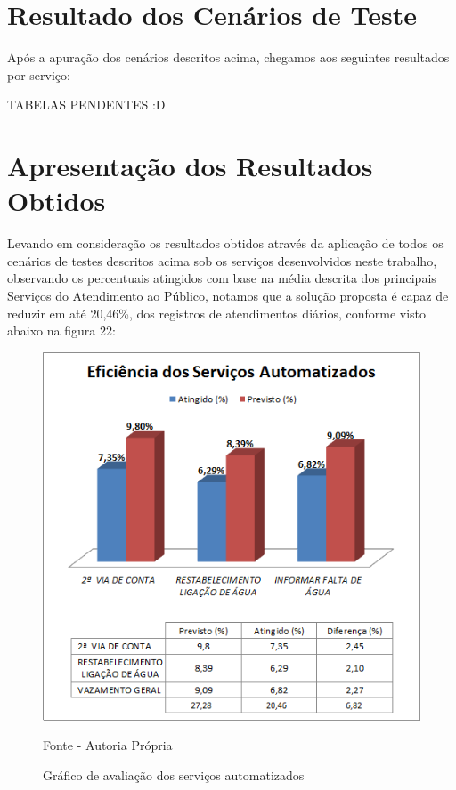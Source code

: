 \section{Resultado dos Cenários de Teste}

Após a apuração dos cenários descritos acima, chegamos aos seguintes resultados por serviço:

\begin{center}
	TABELAS PENDENTES :D		
\end{center}


\section{Apresentação dos Resultados Obtidos}

Levando em consideração os resultados obtidos através da aplicação de todos os cenários de testes descritos acima sob os serviços desenvolvidos neste trabalho, observando os percentuais atingidos com base na média descrita dos principais Serviços do Atendimento ao Público, notamos que a solução proposta é capaz de reduzir em até 20,46\%, dos registros de atendimentos diários, conforme visto abaixo na figura 22:	


\begin{figure}[!htb]
	\centering
	\includegraphics{figuras/eficiencia_servicos.png}
	\caption{Gráfico de avaliação dos serviços automatizados}	
	Fonte - Autoria Própria
\end{figure}

